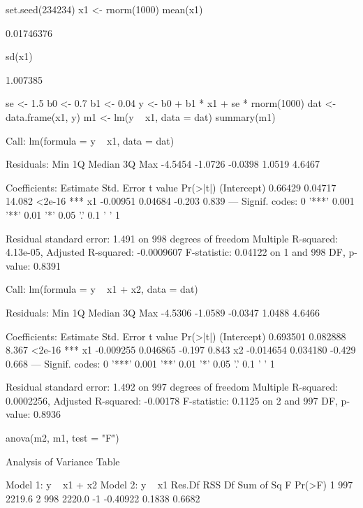 \begin{Schunk}
\begin{Sinput}
 set.seed(234234)
 x1 <- rnorm(1000)
 mean(x1)
\end{Sinput}
\begin{Soutput}
[1] 0.01746376
\end{Soutput}
\begin{Sinput}
 sd(x1)
\end{Sinput}
\begin{Soutput}
[1] 1.007385
\end{Soutput}
\begin{Sinput}
 se <- 1.5
 b0 <- 0.7
 b1 <- 0.04
 y <- b0 + b1 * x1 + se * rnorm(1000)
 dat <- data.frame(x1, y)
 m1 <- lm(y ~ x1, data = dat)
 summary(m1)
\end{Sinput}
\begin{Soutput}
Call:
lm(formula = y ~ x1, data = dat)

Residuals:
    Min      1Q  Median      3Q     Max 
-4.5454 -1.0726 -0.0398  1.0519  4.6467 

Coefficients:
            Estimate Std. Error t value Pr(>|t|)    
(Intercept)  0.66429    0.04717  14.082   <2e-16 ***
x1          -0.00951    0.04684  -0.203    0.839    
---
Signif. codes:  0 '***' 0.001 '**' 0.01 '*' 0.05 '.' 0.1 ' ' 1

Residual standard error: 1.491 on 998 degrees of freedom
Multiple R-squared:  4.13e-05,	Adjusted R-squared:  -0.0009607 
F-statistic: 0.04122 on 1 and 998 DF,  p-value: 0.8391
\end{Soutput}
\begin{Soutput}
Call:
lm(formula = y ~ x1 + x2, data = dat)

Residuals:
    Min      1Q  Median      3Q     Max 
-4.5306 -1.0589 -0.0347  1.0488  4.6466 

Coefficients:
             Estimate Std. Error t value Pr(>|t|)    
(Intercept)  0.693501   0.082888   8.367   <2e-16 ***
x1          -0.009255   0.046865  -0.197    0.843    
x2          -0.014654   0.034180  -0.429    0.668    
---
Signif. codes:  0 '***' 0.001 '**' 0.01 '*' 0.05 '.' 0.1 ' ' 1

Residual standard error: 1.492 on 997 degrees of freedom
Multiple R-squared:  0.0002256,	Adjusted R-squared:  -0.00178 
F-statistic: 0.1125 on 2 and 997 DF,  p-value: 0.8936
\end{Soutput}
\begin{Sinput}
 anova(m2, m1, test = "F")
\end{Sinput}
\begin{Soutput}
Analysis of Variance Table

Model 1: y ~ x1 + x2
Model 2: y ~ x1
  Res.Df    RSS Df Sum of Sq      F Pr(>F)
1    997 2219.6                           
2    998 2220.0 -1  -0.40922 0.1838 0.6682
\end{Soutput}
\end{Schunk}
